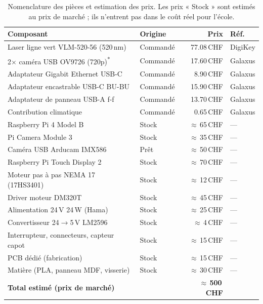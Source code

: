 \begin{table}[H]
  \centering
  \begin{tabular}{@{}p{6.5cm}p{2.2cm}r p{2.3cm}@{}}
    \toprule
    \textbf{Composant} & \textbf{Origine} & \textbf{Prix} & \textbf{Réf.} \\
    \midrule
    Laser ligne vert VLM-520-56 (520\,nm) & Commandé    & 77.08\,CHF & DigiKey \\
    2$\times$ caméra USB OV9726 (720p)\textsuperscript{*} & Commandé & 17.60\,CHF & Galaxus \\
    Adaptateur Gigabit Ethernet USB-C      & Commandé    & 8.90\,CHF  & Galaxus \\
    Adaptateur encastrable USB-C BU-BU     & Commandé    & 15.90\,CHF & Galaxus \\
    Adaptateur de panneau USB-A f-f        & Commandé    & 13.70\,CHF & Galaxus \\
    Contribution climatique                & Commandé    & 0.65\,CHF  & Galaxus \\
    \midrule
    Raspberry Pi 4 Model B                 & Stock       & $\approx$\,65\,CHF & --- \\
    Pi Camera Module 3                     & Stock       & $\approx$\,35\,CHF & --- \\
    Caméra USB Arducam IMX586              & Prêt        & $\approx$\,50\,CHF & --- \\
    Raspberry Pi Touch Display 2           & Stock       & $\approx$\,70\,CHF & --- \\
    Moteur pas à pas NEMA 17 (17HS3401)    & Stock       & $\approx$\,12\,CHF & --- \\
    Driver moteur DM320T                   & Stock       & $\approx$\,45\,CHF & --- \\
    Alimentation 24\,V 24\,W (Hama)        & Stock       & $\approx$\,25\,CHF & --- \\
    Convertisseur 24$\to$5\,V LM2596       & Stock       & $\approx$\,4\,CHF  & --- \\
    Interrupteur, connecteurs, capteur capot & Stock     & $\approx$\,15\,CHF & --- \\
    PCB dédié (fabrication)                & Stock       & $\approx$\,15\,CHF & --- \\
    Matière (PLA, panneau MDF, visserie)   & Stock       & $\approx$\,30\,CHF & --- \\
    \midrule
    \textbf{Total estimé (prix de marché)} & & \textbf{$\approx$\,500\,CHF} & \\
    \bottomrule
  \end{tabular}
  \caption{Nomenclature des pièces et estimation des prix. Les prix « Stock » sont estimés au prix de marché ; ils n'entrent pas dans le coût réel pour l'école.}
  \label{tab:budget-bom}
\end{table}

